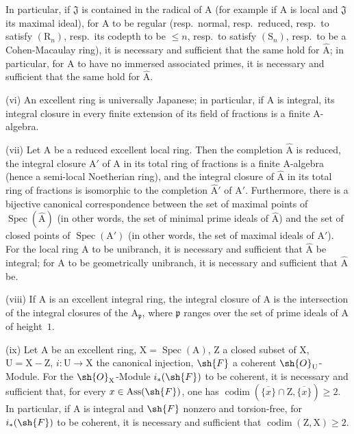 \begin{scholium}[7.8.3]
In particular, if $\mathfrak{J}$ is contained in the radical of $\mathrm{A}$ (for example if $\mathrm{A}$ is local and $\mathfrak{J}$ its maximal ideal), for $\mathrm{A}$ to be regular (resp.\ normal, resp.\ reduced, resp.\ to satisfy $(\mathrm{R}_n)$, resp.\ its codepth to be $\leqslant n$, resp.\ to satisfy $(\mathrm{S}_n)$, resp.\ to be a Cohen-Macaulay ring), it is necessary and sufficient that the same hold for $\widehat{\mathrm{A}}$; in particular, for $\mathrm{A}$ to have no immersed associated primes, it is necessary and sufficient that the same hold for $\widehat{\mathrm{A}}$.

(vi) An excellent ring is universally Japanese; in particular, if $\mathrm{A}$ is integral, its integral closure in every finite extension of its field of fractions is a finite $\mathrm{A}$-algebra.

(vii) Let $\mathrm{A}$ be a reduced excellent local ring. Then the completion $\widehat{\mathrm{A}}$ is reduced, the integral closure $\mathrm{A}'$ of $\mathrm{A}$ in its total ring of fractions is a finite $\mathrm{A}$-algebra (hence a semi-local Noetherian ring), and the integral closure of $\widehat{\mathrm{A}}$ in its total ring of fractions is isomorphic to the completion $\widehat{\mathrm{A}}'$ of $\mathrm{A}'$. Furthermore, there is a bijective canonical correspondence between the set of maximal points of $\operatorname{Spec}(\widehat{\mathrm{A}})$ (in other words, the set of minimal prime ideals of $\widehat{\mathrm{A}}$) and the set of closed points of $\operatorname{Spec}(\mathrm{A}')$ (in other words, the set of maximal ideals of $\mathrm{A}'$). For the local ring $\mathrm{A}$ to be unibranch, it is necessary and sufficient that $\widehat{\mathrm{A}}$ be integral; for $\mathrm{A}$ to be geometrically unibranch, it is necessary and sufficient that $\widehat{\mathrm{A}}$ be.

(viii) If $\mathrm{A}$ is an excellent integral ring, the integral closure of $\mathrm{A}$ is the intersection of the integral closures of the $\mathrm{A}_\mathfrak{p}$, where $\mathfrak{p}$ ranges over the set of prime ideals of $\mathrm{A}$ of height~$1$.

(ix) Let $\mathrm{A}$ be an excellent ring, $\mathrm{X}=\operatorname{Spec}(\mathrm{A})$, $\mathrm{Z}$ a closed subset of $\mathrm{X}$, $\mathrm{U}=\mathrm{X}-\mathrm{Z}$, $i:\mathrm{U}\to\mathrm{X}$ the canonical injection, $\sh{F}$ a coherent $\sh{O}_\mathrm{U}$-Module. For the $\sh{O}_\mathrm{X}$-Module $i_*(\sh{F})$ to be coherent, it is necessary and sufficient that, for every $x\in\operatorname{Ass}(\sh{F})$, one has $\operatorname{codim}(\overline{\{x\}}\cap\mathrm{Z},\overline{\{x\}})\geqslant 2$. In particular, if $\mathrm{A}$ is integral and $\sh{F}$ nonzero and torsion-free, for $i_*(\sh{F})$ to be coherent, it is necessary and sufficient that $\operatorname{codim}(\mathrm{Z},\mathrm{X})\geqslant 2$.


\end{scholium}
